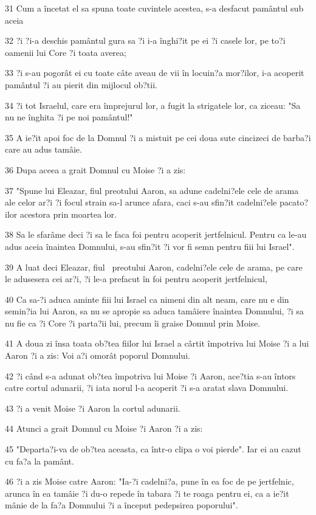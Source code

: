 \par 31 Cum a încetat el sa spuna toate cuvintele acestea, s-a desfacut pamântul sub aceia
\par 32 ?i ?i-a deschis pamântul gura sa ?i i-a înghi?it pe ei ?i casele lor, pe to?i oamenii lui Core ?i toata averea;
\par 33 ?i s-au pogorât ei cu toate câte aveau de vii în locuin?a mor?ilor, i-a acoperit pamântul ?i au pierit din mijlocul ob?tii.
\par 34 ?i tot Israelul, care era împrejurul lor, a fugit la strigatele lor, ca ziceau: "Sa nu ne înghita ?i pe noi pamântul!"
\par 35 A ie?it apoi foc de la Domnul ?i a mistuit pe cei doua sute cincizeci de barba?i care au adus tamâie.
\par 36 Dupa aceea a grait Domnul cu Moise ?i a zis:
\par 37 "Spune lui Eleazar, fiul preotului Aaron, sa adune cadelni?ele cele de arama ale celor ar?i ?i focul strain sa-l arunce afara, caci s-au sfin?it cadelni?ele pacato?ilor acestora prin moartea lor.
\par 38 Sa le sfarâme deci ?i sa le faca foi pentru acoperit jertfelnicul. Pentru ca le-au adus aceia înaintea Domnului, s-au sfin?it ?i vor fi semn pentru fiii lui Israel".
\par 39 A luat deci Eleazar, fiul  preotului Aaron, cadelni?ele cele de arama, pe care le adusesera cei ar?i, ?i le-a prefacut în foi pentru acoperit jertfelnicul,
\par 40 Ca sa-?i aduca aminte fiii lui Israel ca nimeni din alt neam, care nu e din semin?ia lui Aaron, sa nu se apropie sa aduca tamâiere înaintea Domnului, ?i sa nu fie ca ?i Core ?i parta?ii lui, precum îi graise Domnul prin Moise.
\par 41 A doua zi însa toata ob?tea fiilor lui Israel a cârtit împotriva lui Moise ?i a lui Aaron ?i a zis: Voi a?i omorât poporul Domnului.
\par 42 ?i când s-a adunat ob?tea împotriva lui Moise ?i Aaron, ace?tia s-au întors catre cortul adunarii, ?i iata norul l-a acoperit ?i s-a aratat slava Domnului.
\par 43 ?i a venit Moise ?i Aaron la cortul adunarii.
\par 44 Atunci a grait Domnul cu Moise ?i Aaron ?i a zis:
\par 45 "Departa?i-va de ob?tea aceasta, ca într-o clipa o voi pierde". Iar ei au cazut cu fa?a la pamânt.
\par 46 ?i a zis Moise catre Aaron: "Ia-?i cadelni?a, pune în ea foc de pe jertfelnic, arunca în ea tamâie ?i du-o repede în tabara ?i te roaga pentru ei, ca a ie?it mânie de la fa?a Domnului ?i a început pedepsirea poporului".

